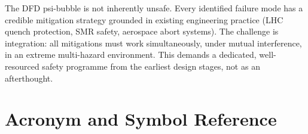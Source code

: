 \documentclass[11pt,a4paper]{article}
\begin{document}
The DFD psi-bubble is not inherently unsafe. Every identified
failure mode has a credible mitigation strategy grounded in
existing engineering practice (LHC quench protection, SMR safety,
aerospace abort systems). The challenge is integration: all mitigations
must work simultaneously, under mutual interference, in an extreme
multi-hazard environment. This demands a dedicated, well-resourced
safety programme from the earliest design stages, not as an afterthought.

\appendix
\section{Acronym and Symbol Reference}
\end{document}
